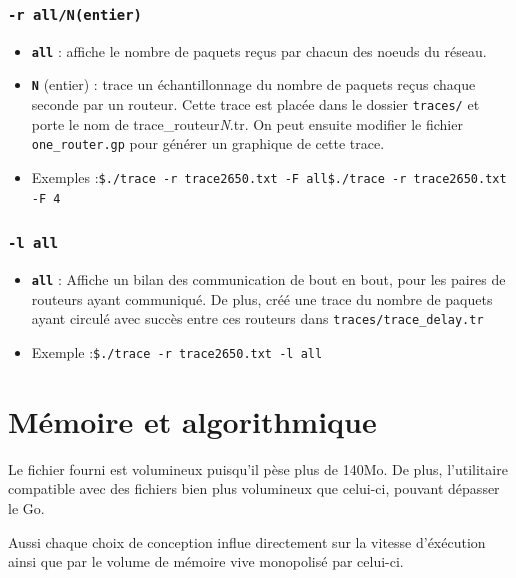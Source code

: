\documentclass[
10pt, %
a4paper, %
oneside, %
headinclude,footinclude, %
BCOR5mm, %
]{scrartcl}
\begin{document}
\subsubsection{\texttt{-r all/N(entier)}}
\begin{itemize}
  \item \textbf{\texttt{all}} : affiche le nombre de paquets reçus par chacun des noeuds du réseau.
  \item \textbf{\texttt{N}} (entier) : trace un échantillonnage du nombre de paquets reçus chaque seconde par un routeur. Cette trace est placée dans le dossier \texttt{traces/} et porte le nom de trace\_routeur\textit{N}.tr. On peut ensuite modifier le fichier \texttt{one\_router.gp} pour générer un graphique de cette trace.
  \item Exemples :\newline\texttt{\$./trace -r trace2650.txt -F all}\newline\texttt{\$./trace -r trace2650.txt -F 4}
\end{itemize}
  
\subsubsection{\texttt{-l all}}
\begin{itemize}
  \item \textbf{\texttt{all}} : Affiche un bilan des communication de bout en bout, pour les paires de routeurs ayant communiqué. \newline De plus, créé une trace du nombre de paquets ayant circulé avec succès entre ces routeurs dans \texttt{traces/trace\_delay.tr}
  \item Exemple :\newline\texttt{\$./trace -r trace2650.txt -l all}
\end{itemize}


\section{Mémoire et algorithmique}
Le fichier fourni est volumineux puisqu'il pèse plus de 140Mo. De plus, l'utilitaire compatible avec des fichiers bien plus volumineux que celui-ci, pouvant dépasser le Go. 

Aussi chaque choix de conception influe directement sur la vitesse d'éxécution ainsi que par le volume de mémoire vive monopolisé par celui-ci.
\end{document}
